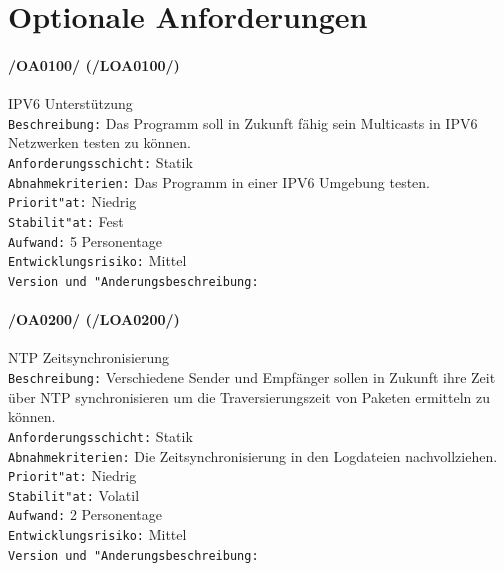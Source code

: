 \section{Optionale Anforderungen}
\label{sec:optional}


\paragraph{/OA0100/ (/LOA0100/)} IPV6 Unterstützung\\
\texttt{Beschreibung:} Das Programm soll in Zukunft fähig sein Multicasts in
IPV6 Netzwerken testen zu können.\\
\texttt{Anforderungsschicht:} Statik\\ 
\texttt{Abnahmekriterien:} Das Programm in einer IPV6 Umgebung testen.\\
\texttt{Priorit"at:} Niedrig\\
\texttt{Stabilit"at:} Fest\\
\texttt{Aufwand:} 5 Personentage\\
\texttt{Entwicklungsrisiko:} Mittel\\
\texttt{Version und "Anderungsbeschreibung:}\newline

\paragraph{/OA0200/ (/LOA0200/)} NTP Zeitsynchronisierung\\
\texttt{Beschreibung:} Verschiedene Sender und Empfänger sollen in Zukunft
ihre Zeit über NTP synchronisieren um die Traversierungszeit von Paketen
ermitteln zu können.\\ 
\texttt{Anforderungsschicht:} Statik\\ 
\texttt{Abnahmekriterien:} Die Zeitsynchronisierung in den Logdateien
nachvollziehen.\\ 
\texttt{Priorit"at:} Niedrig\\
\texttt{Stabilit"at:} Volatil\\
\texttt{Aufwand:} 2 Personentage\\
\texttt{Entwicklungsrisiko:} Mittel\\
\texttt{Version und "Anderungsbeschreibung:}

